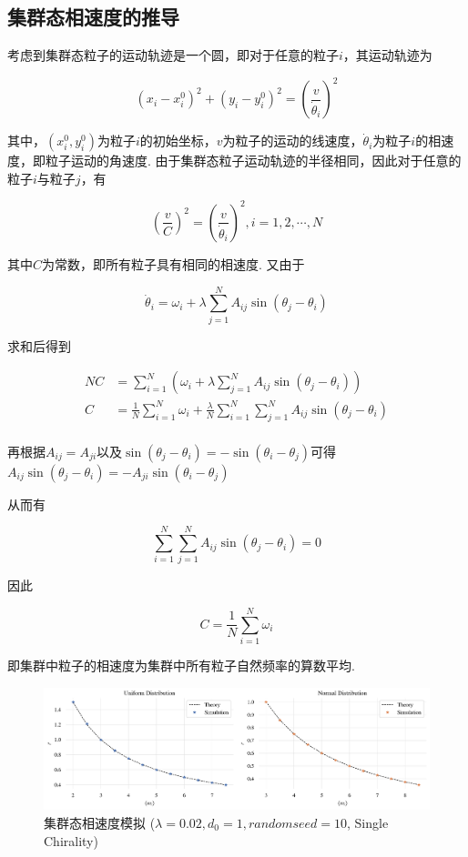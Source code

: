 \documentclass{article}
\begin{document}
\subsection{集群态相速度的推导}

考虑到集群态粒子的运动轨迹是一个圆，即对于任意的粒子$i$，其运动轨迹为

$$
\left( x_i-x_{i}^{0} \right) ^2+\left( y_i-y_{i}^{0} \right) ^2=\left( \frac{v}{\dot{\theta}_i} \right) ^2
$$

其中，$\left( x_{i}^{0},y_{i}^{0} \right)$为粒子$i$的初始坐标，$v$为粒子的运动的线速度，$\dot{\theta}_i$为粒子$i$的相速度，即粒子运动的角速度. 由于集群态粒子运动轨迹的半径相同，因此对于任意的粒子$i$与粒子$j$，有

$$
\left( \frac{v}{C} \right) ^2=\left( \frac{v}{\dot{\theta}_i} \right) ^2,i=1,2,\cdots ,N
$$

其中$C$为常数，即所有粒子具有相同的相速度. 又由于

$$
\dot{\theta}_i=\omega _i+\lambda \sum_{j=1}^N{A_{ij}\sin \left( \theta _j-\theta _i \right)}
$$

求和后得到
\vspace{-0.5cm}

$$
\begin{aligned}
	NC&=\sum_{i=1}^N{\left( \omega _i+\lambda \sum_{j=1}^N{A_{ij}\sin \left( \theta _j-\theta _i \right)} \right)}\\
	C&=\frac{1}{N}\sum_{i=1}^N{\omega _i}+\frac{\lambda}{N}\sum_{i=1}^N{\sum_{j=1}^N{A_{ij}\sin \left( \theta _j-\theta _i \right)}}\\
\end{aligned}
$$

再根据$A_{ij}=A_{ji}$以及$\sin \left( \theta _j-\theta _i \right)=-\sin \left( \theta _i-\theta _j \right)$可得$
A_{ij}\sin \left( \theta _j-\theta _i \right) =-A_{ji}\sin \left( \theta _i-\theta _j \right) 
$

从而有

$$
\sum_{i=1}^N{\sum_{j=1}^N{A_{ij}\sin \left( \theta _j-\theta _i \right)}}=0
$$

因此
\vspace{-0.5cm}

$$
C=\frac{1}{N}\sum_{i=1}^N{\omega _i}
$$


即集群中粒子的相速度为集群中所有粒子自然频率的算数平均.

\begin{figure}[H]
	\centering
	\includegraphics[width=\textwidth]{./figs/swarmRadiusSimu.png}
	\vspace{-1cm}
	\caption{集群态相速度模拟 ($\lambda=0.02, d_0=1, random seed=10$, Single Chirality)}
	\label{fig:fig22}
\end{figure}
\end{document}

